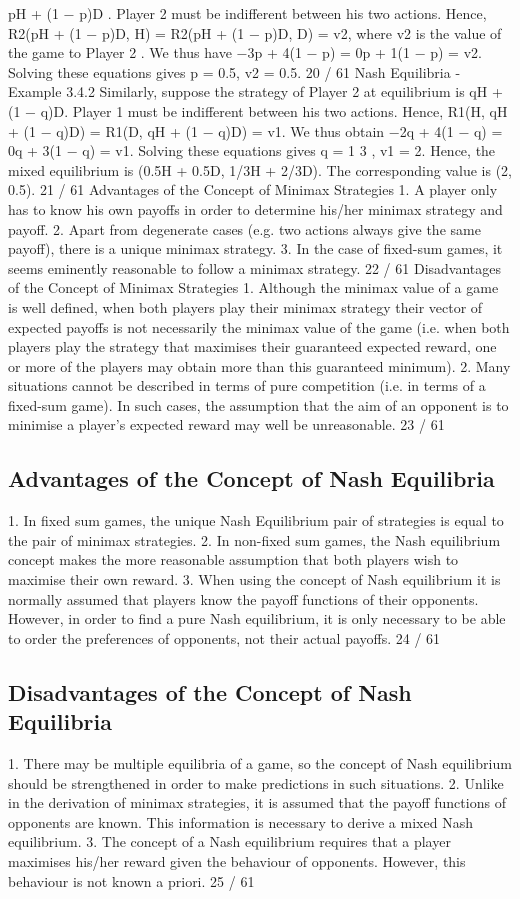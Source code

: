 \documentclass[]{report}
\begin{document}
pH + (1 − p)D . Player 2 must be indifferent between his two
actions. Hence,
R2(pH + (1 − p)D, H) = R2(pH + (1 − p)D, D) = v2,
where v2 is the value of the game to Player 2 .
We thus have −3p + 4(1 − p) = 0p + 1(1 − p) = v2. Solving these
equations gives p = 0.5, v2 = 0.5.
20 / 61
Nash Equilibria - Example 3.4.2
Similarly, suppose the strategy of Player 2 at equilibrium is
qH + (1 − q)D. Player 1 must be indifferent between his two
actions. Hence,
R1(H, qH + (1 − q)D) = R1(D, qH + (1 − q)D) = v1.
We thus obtain −2q + 4(1 − q) = 0q + 3(1 − q) = v1. Solving
these equations gives q =
1
3
, v1 = 2.
Hence, the mixed equilibrium is (0.5H + 0.5D, 1/3H + 2/3D). The
corresponding value is (2, 0.5).
21 / 61
Advantages of the Concept of Minimax Strategies
1. A player only has to know his own payoffs in order to
determine his/her minimax strategy and payoff.
2. Apart from degenerate cases (e.g. two actions always
give the same payoff), there is a unique minimax
strategy.
3. In the case of fixed-sum games, it seems eminently
reasonable to follow a minimax strategy.
22 / 61
Disadvantages of the Concept of Minimax Strategies
1. Although the minimax value of a game is well
defined, when both players play their minimax
strategy their vector of expected payoffs is not
necessarily the minimax value of the game (i.e. when
both players play the strategy that maximises their
guaranteed expected reward, one or more of the
players may obtain more than this guaranteed
minimum).
2. Many situations cannot be described in terms of pure
competition (i.e. in terms of a fixed-sum game). In
such cases, the assumption that the aim of an
opponent is to minimise a player’s expected reward
may well be unreasonable.
23 / 61
\subsection{Advantages of the Concept of Nash Equilibria}
1. In fixed sum games, the unique Nash Equilibrium pair
of strategies is equal to the pair of minimax
strategies.
2. In non-fixed sum games, the Nash equilibrium
concept makes the more reasonable assumption that
both players wish to maximise their own reward.
3. When using the concept of Nash equilibrium it is
normally assumed that players know the payoff
functions of their opponents. However, in order to
find a pure Nash equilibrium, it is only necessary to
be able to order the preferences of opponents, not
their actual payoffs.
24 / 61
\subsection{Disadvantages of the Concept of Nash Equilibria}
1. There may be multiple equilibria of a game, so the
concept of Nash equilibrium should be strengthened
in order to make predictions in such situations.
2. Unlike in the derivation of minimax strategies, it is
assumed that the payoff functions of opponents are
known. This information is necessary to derive a
mixed Nash equilibrium.
3. The concept of a Nash equilibrium requires that a
player maximises his/her reward given the behaviour
of opponents. However, this behaviour is not known
a priori.
25 / 61
\end{document}
